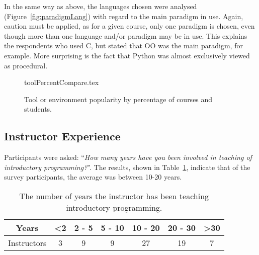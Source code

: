 \documentclass{sig-alternate}
\begin{document}

In the same way as above, the languages chosen were analysed
(Figure~\ref{fig:paradigmLang}) with regard to the main paradigm in
use. Again, caution must be applied, as for a given course, only one
paradigm is chosen, even though more than one language and/or paradigm
may be in use. This explains the respondents who used C, but stated
that OO was the main paradigm, for example. More surprising is the
fact that Python was almost exclusively viewed as procedural.



%

\begin{figure}[ht]
\begin{center}
{toolPercentCompare.tex}\vskip-18pt
\caption{Tool or environment popularity by percentage of courses and students.\label{fig:tools}}
\end{center}
\end{figure}

\subsection{Instructor Experience}

Participants were asked: ``{\emph{How many years have you been
involved in teaching of introductory programming?}}''. The results,
shown in Table~\ref{tab:yearsTeaching}, indicate that of the survey
participants, the average was between 10-20 years.


\begin{table}[ht]
\centering
\caption{The number of years the instructor has been teaching introductory programming.}
\label{tab:yearsTeaching}
\begin{tabular}{ccccccc}
\hline
Years       & \textless 2 & 2 - 5 & 5 - 10 & 10 - 20 & 20 - 30 & \textgreater 30 \\ \hline
Instructors & 3          & 9     & 9      & 27      & 19      & 7              \\ \hline
\end{tabular}
\end{table}
\end{document}
